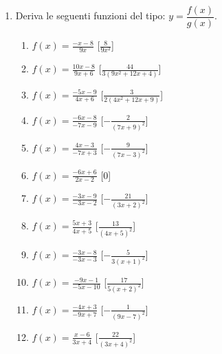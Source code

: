 \begin{enumerate}
\item Deriva le seguenti funzioni del tipo: \(y=\dfrac{f(x)}{g(x)}\).

\begin{multicols}{2}
\begin{enumerate}
\item \(f(x)=\frac{- x - 8}{9 x}\)
  \hfill [\(\frac{8}{9 x^{2}}\)]
\item \(f(x)=\frac{10 x - 8}{9 x + 6}\)
  \hfill [\(\frac{44}{3 \left(9 x^{2} + 12 x + 4\right)}\)]
\item \(f(x)=\frac{- 5 x - 9}{4 x + 6}\)
  \hfill [\(\frac{3}{2 \left(4 x^{2} + 12 x + 9\right)}\)]
\item \(f(x)=\frac{- 6 x - 8}{- 7 x - 9}\)
  \hfill [\(- \frac{2}{\left(7 x + 9\right)^{2}}\)]
\item \(f(x)=\frac{4 x - 3}{- 7 x + 3}\)
  \hfill [\(- \frac{9}{\left(7 x - 3\right)^{2}}\)]
\item \(f(x)=\frac{- 6 x + 6}{2 x - 2}\)
  \hfill [\(0\)]
\item \(f(x)=\frac{- 3 x - 9}{- 3 x - 2}\)
  \hfill [\(- \frac{21}{\left(3 x + 2\right)^{2}}\)]
\item \(f(x)=\frac{5 x + 3}{4 x + 5}\)
  \hfill [\(\frac{13}{\left(4 x + 5\right)^{2}}\)]
\item \(f(x)=\frac{- 3 x - 8}{- 3 x - 3}\)
  \hfill [\(- \frac{5}{3 \left(x + 1\right)^{2}}\)]
\item \(f(x)=\frac{- 9 x - 1}{- 5 x - 10}\)
  \hfill [\(\frac{17}{5 \left(x + 2\right)^{2}}\)]
\item \(f(x)=\frac{- 4 x + 3}{- 9 x + 7}\)
  \hfill [\(- \frac{1}{\left(9 x - 7\right)^{2}}\)]
\item \(f(x)=\frac{x - 6}{3 x + 4}\)
  \hfill [\(\frac{22}{\left(3 x + 4\right)^{2}}\)]


\end{enumerate}
\end{multicols}
\end{enumerate}
